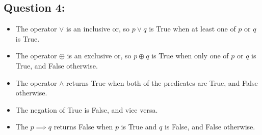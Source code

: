 \documentclass[12pt]{extreport}
\newcommand{\xor}[0]{\oplus}
\begin{document}
\subsection*{Question 4:}

\begin{itemize}
    \item The operator \( \lor \) is an inclusive or, so \( p \lor q \) is True when at least one of \( p \) or \( q \) is True.
    \item The operator \( \xor \) is an exclusive or, so \( p \xor q \) is True when only one of \( p \) or \( q \) is True, and False otherwise.
    \item The operator \( \land \) returns True when both of the predicates are True, and False otherwise.
    \item The negation of True is False, and vice versa.
    \item The \( p \implies q \) returns False when \( p \) is True and \( q \) is False, and False otherwise.
\end{itemize}
\end{document}
